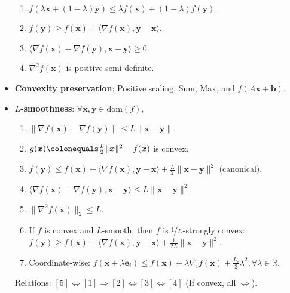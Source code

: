 \documentclass[8pt,a4paper]{extarticle}
\newcommand{\R}{\mathbb{R}}
\renewcommand{\vec}[1]{\bm{#1}}
\newcommand{\mat}[1]{#1}
\newcommand{\dom}[1]{\mathrm{dom}(#1)}
\newenvironment{topic}[1]
{\textbf{\sffamily \colorbox{black}{\rlap{\textbf{\textcolor{white}{#1}}}\hspace{\linewidth}\hspace{-2\fboxsep}}} \\ \vspace{0.2cm}}
{}
\begin{document}
\begin{multicols*}{2}
\begin{topic}{Definitions}
\begin{itemize}
\begin{enumerate}
                      \item $f(\lambda \vec{x} + (1-\lambda)\vec{y}) \leq \lambda f(\vec{x}) + (1-\lambda) f(\vec{y})$.
                      \item $f(\vec{y}) \geq f(\vec{x}) + \langle \nabla f(\vec{x}), \vec{y} - \vec{x} \rangle$.
                      \item $\langle \nabla f(\vec{x}) - \nabla f(\vec{y}), \vec{x} - \vec{y} \rangle \geq 0$.
                      \item $\nabla^2 f(\vec{x})$ is positive semi-definite.
                  \end{enumerate}
            \item \textbf{Convexity preservation}: Positive scaling, Sum, Max, and $f(\mat{A} \vec{x} + \vec{b})$.
            \item \textbf{$L$-smoothness}: $\forall \vec{x}, \vec{y} \in \dom{f}$,
                  \begin{enumerate}
                      \item $\| \nabla f(\vec{x}) - \nabla f(\vec{y}) \| \leq L \| \vec{x} - \vec{y} \|$.
                      \item $g(\vec{x}) \colonequals \frac{L}{2} \| \vec{x} \|^2 - f(\vec{x})$ is convex.
                      \item $f(\vec{y}) \leq f(\vec{x}) + \langle \nabla f(\vec{x}), \vec{y} - \vec{x} \rangle + \frac{L}{2} \| \vec{x} - \vec{y} \|^2$ (canonical).
                      \item $\langle \nabla f(\vec{x}) - \nabla f(\vec{y}), \vec{x} - \vec{y} \rangle \leq L \| \vec{x} - \vec{y} \|^2$.
                      \item $\| \nabla^2 f(\vec{x}) \|_2 \leq L$.
                      \item If $f$ is convex and $L$-smooth, then $f$ is $\nicefrac{1}{L}$-strongly convex: \\ $f(\vec{y}) \geq
                                f(\vec{x}) + \langle \nabla f(\vec{x}), \vec{y} - \vec{x} \rangle + \frac{1}{2L} \| \vec{x} -
                                \vec{y} \|^2$.
                      \item Coordinate-wise: $f(\vec{x} + \lambda \vec{e}_i) \leq f(\vec{x}) + \lambda \nabla_i f(\vec{x}) +
                                \frac{L_i}{2} \lambda^2, \forall \lambda \in \R$.
                  \end{enumerate}
                  Relations: $[5] \Leftrightarrow [1] \Rightarrow [2] \Leftrightarrow [3] \Leftrightarrow [4]$ (If convex, all $\Leftrightarrow$).

\end{itemize}
\end{topic}
\end{multicols*}
\end{document}
